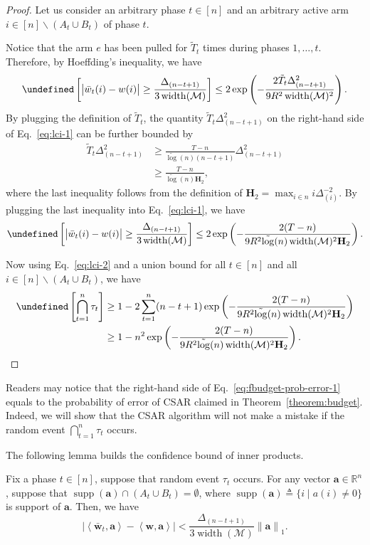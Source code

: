 \documentclass{article}
\newcommand{\AlgorithmBud}{{\small \textsf{CSAR}}\xspace}
\newcommand{\M}{\mathcal M}
\newcommand{\del}{\backslash}
\newcommand{\RR}{\mathbb R}
\DeclareMathOperator{\supp}{supp}
\DeclareMathOperator{\rank}{width}
\newcommand{\barlog}{\tilde{\log}}
\let\Pr\undefined
\DeclareMathOperator{\Pr}{Pr}
\newcommand{\inn}[1]{\left\langle #1 \right\rangle}
\newcommand{\nor}[1]{\left\|#1\right\|}
\renewcommand{\vec}[1]{\boldsymbol{#1}}
\begin{document}
\begin{proof}
Let us consider an arbitrary phase $t\in [n]$ and an arbitrary active arm $i\in [n]\del (A_t\cup B_t)$ of phase $t$.

Notice that the arm $e$ has been pulled for $\tilde T_t$ times during phases $1,\ldots, t$. 
Therefore,
by Hoeffding's inequality, we have
\begin{align}
	\Pr\left[ \big|\bar w_t(i)-w(i)\big| \ge \frac{\Delta_{(n-t+1)}}{3\rank(\M)} \right] \le
	2\exp\left(-\frac{2\tilde T_t \Delta_{(n-t+1)}^2}{9R^2\rank(\M)^2} \right).
	\label{eq:lci-1}
\end{align}
By plugging the definition of $\tilde T_t$, the quantity $\tilde T_t\Delta_{(n-t+1)}^2$ on the right-hand side of Eq.~\eqref{eq:lci-1} can be further bounded by
\begin{align*}
\tilde T_t\Delta_{(n-t+1)}^2 
&\ge \frac{T-n}{\barlog(n)(n-t+1)}\Delta_{(n-t+1)}^2\\
&\ge \frac{T-n}{\barlog(n) \mathbf H_2},
\end{align*}
where the last inequality follows from the definition of $\mathbf H_2=\max_{i\in n} i\Delta_{(i)}^{-2}$.
By plugging the last inequality into Eq.~\eqref{eq:lci-1}, we have
\begin{equation}
\label{eq:lci-2}
	\Pr\left[ \big|\bar w_t(i)-w(i)\big| \ge \frac{\Delta_{(n-t+1)}}{3\rank(\M)} \right] \le
	2\exp\left(-\frac{2(T-n)}{9R^2 \barlog(n) \rank(\M)^2 \mathbf H_2} \right).
\end{equation}

Now using Eq.~\eqref{eq:lci-2} and a union bound for all $t \in [n]$ and all $i\in[n]\del (A_t\cup B_t)$, we have
\begin{align*}
\Pr\left[\bigcap_{t=1}^n \tau_t\right] &
\ge 1-2\sum_{t=1}^n (n-t+1)\exp\left(-\frac{2(T-n)}{9R^2 \barlog(n) \rank(\M)^2 \mathbf H_2} \right)\\
&\ge 1-n^2  \exp\left(-\frac{2(T-n)}{9R^2 \barlog(n) \rank(\M)^2 \mathbf H_2} \right).
\end{align*}

\end{proof}

Readers may notice that the right-hand side of Eq.~\eqref{eq:fbudget-prob-error-1} equals to the probability of error of \AlgorithmBud claimed in Theorem~\ref{theorem:budget}. 
Indeed, we will show that the \AlgorithmBud algorithm will not make a mistake if the random event $\bigcap_{t=1}^n \tau_t$ occurs.

The following lemma builds the confidence bound of inner products.
\begin{lemma}
Fix a phase $t\in[n]$, suppose that random event $\tau_t$ occurs.
For any vector $\vec a \in \RR^n$, suppose that $\supp(\vec a) \cap (A_t\cup B_t) = \emptyset$, where 
$\supp(\vec a) \triangleq \{i\;|\; a(i) \not=0\}$ is support of $\vec a$.
Then, we have
$$
\left| \inn{\vec{\bar w}_t, \vec a} - \inn{\vec w, \vec a} \right|
< \frac{\Delta_{(n-t+1)}}{3\rank(\M)} \nor{\vec a}_1.
$$
\label{lemma:fbudget:ciproerty}
\end{lemma}
\end{document}
